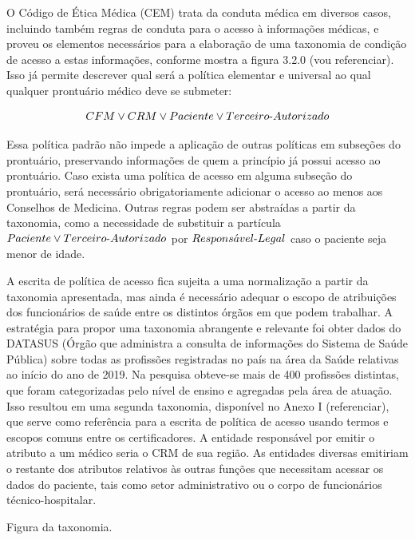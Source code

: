 \documentclass[a4paper,11pt]{article}
\begin{document}
O Código de Ética Médica (CEM) trata da conduta médica em diversos casos, incluindo também regras de conduta para o acesso à informações médicas, e proveu os elementos necessários para a elaboração de uma taxonomia de condição de acesso a estas informações, conforme mostra a figura 3.2.0 {\color{RoyalBlue}(vou referenciar)}. Isso já permite descrever qual será a política elementar e universal ao qual qualquer prontuário médico deve se submeter:

\[ CFM \vee CRM \vee Paciente \vee Terceiro\textnormal{-}Autorizado \]

Essa política padrão não impede a aplicação de outras políticas em subseções do prontuário, preservando informações de quem a princípio já possui acesso ao prontuário. Caso exista uma política de acesso em alguma subseção do prontuário, será necessário obrigatoriamente adicionar o acesso ao menos aos Conselhos de Medicina. Outras regras podem ser abstraídas a partir da taxonomia, como a necessidade de substituir a partícula $Paciente \vee Terceiro\textnormal{-}Autorizado$ por $Respons\acute{a}vel\textnormal{-}Legal$ caso o paciente seja menor de idade.

A escrita de política de acesso fica sujeita a uma normalização a partir da taxonomia apresentada, mas ainda é necessário adequar o escopo de atribuições dos funcionários de saúde entre os distintos órgãos em que podem trabalhar. A estratégia para propor uma taxonomia abrangente e relevante foi obter dados do DATASUS (Órgão que administra a consulta de informações do Sistema de Saúde Pública) sobre todas as profissões registradas no país na área da Saúde relativas ao início do ano de 2019. Na pesquisa obteve-se mais de 400 profissões distintas, que foram categorizadas pelo nível de ensino e agregadas pela área de atuação. Isso resultou em uma segunda taxonomia, disponível no Anexo I {\color{RoyalBlue}(referenciar)}, que serve como referência para a escrita de política de acesso usando termos e escopos comuns entre os certificadores. A entidade responsável por emitir o atributo a um médico seria o CRM de sua região. As entidades diversas emitiriam o restante dos atributos relativos às outras funções que necessitam acessar os dados do paciente, tais como setor administrativo ou o corpo de funcionários técnico-hospitalar.

{\color{ForestGreen}Figura da taxonomia}.
\end{document}
